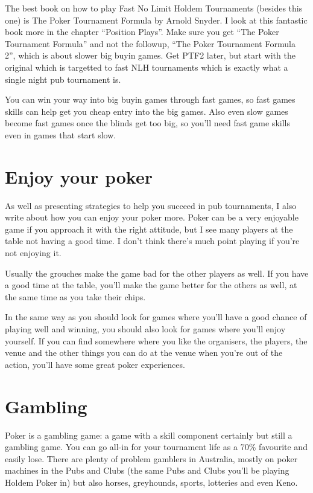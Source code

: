 The best book on how to play Fast No Limit Holdem Tournaments
(besides this one) is The Poker Tournament Formula by Arnold Snyder.
I look at this fantastic book more in the chapter ``Position Plays''.
Make sure you get ``The Poker Tournament Formula'' and not the followup,
``The Poker Tournament Formula 2'', which is about slower big buyin games.
Get PTF2 later, but start with the original which is targetted to fast
NLH tournaments which is exactly what a single night pub tournament is.

You can win your way into big buyin games through fast games,
so fast games skills can help get you cheap entry into the big games.
Also even slow games become fast games once the blinds get too big,
so you'll need fast game skills even in games that start slow.

\section*{Enjoy your poker}

As well as presenting strategies to help you succeed
in pub tournaments,
I also write about how you can enjoy your poker
more. Poker can be a very enjoyable game if you approach
it with the right attitude, but I see many players at the table
not having a good time. I don't think there's much
point playing if you're not enjoying it.

Usually the grouches make the game bad for the other
players as well. If you have a good time at the table, you'll make the
game better for the others as well, at the same time as you take
their chips.

In the same way as you should look for games where you'll have
a good chance of playing well and winning, you should
also look for games where you'll enjoy yourself.
If you can find somewhere where you like
the organisers, the players, the venue and the other things
you can do at the venue when you're out of the action,
you'll have some great poker experiences.

\section*{Gambling}

Poker is a gambling
game: a game with a skill component certainly but still
a gambling game. You can go all-in for your tournament life
as a 70\% favourite and easily lose. There are plenty of problem gamblers
in Australia, mostly on poker machines in the Pubs and Clubs
(the same Pubs and Clubs you'll be playing Holdem Poker
in) but also horses, greyhounds, sports, lotteries and even Keno.

